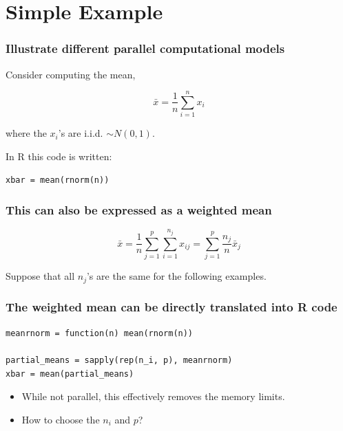 \documentclass{beamer}
\begin{document}
\section{Simple Example}
\begin{frame}[fragile]

\frametitle{Illustrate different parallel computational models}

Consider computing the mean,

\begin{equation}
    \bar{x} = \frac{1}{n} \sum_{i = 1}^n x_i
\label{eq:mean}
\end{equation}

where the $x_i$'s are i.i.d. $\sim N(0, 1)$. 
    
In R this code is written:

\begin{verbatim}
xbar = mean(rnorm(n))
\end{verbatim}

\end{frame}
\begin{frame}

    \frametitle{This can also be expressed as a weighted mean}

\begin{equation}
    \bar{x} = \frac{1}{n} \sum_{j = 1}^p \sum_{i = 1}^{n_j} x_{ij}
    = \sum_{j = 1}^p \frac{n_j}{n} \bar{x}_j
\label{eq:mean_partial}
\end{equation}

Suppose that all $n_j$'s are the same for the following examples.

\end{frame}
\begin{frame}[fragile]

    \frametitle{The weighted mean can be directly translated into R code}

\begin{verbatim}
meanrnorm = function(n) mean(rnorm(n))

partial_means = sapply(rep(n_i, p), meanrnorm)
xbar = mean(partial_means)
\end{verbatim}

\pause 

    \begin{itemize}
        \item While not parallel, this effectively removes the memory limits.
        \item How to choose the $n_i$ and $p$?
    \end{itemize}

\end{frame}
\end{document}
